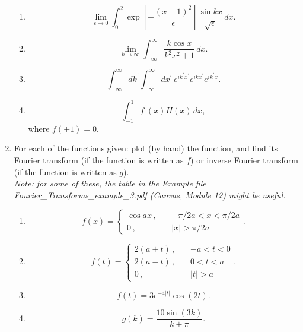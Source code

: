 \documentclass[fleqn]{article}
\begin{document}
\begin{enumerate}
\begin{enumerate}
    \item  
    \[
    \lim_{\epsilon \rightarrow 0}\int_{0}^{2}\exp \left[ -\frac{\left(
    x-1\right) ^{2}}{\epsilon }\right] \frac{\sin kx}{\sqrt{\epsilon }}\,dx.
    \]
    
    \item  
    \[
    \lim_{k\rightarrow \infty }\int_{-\infty }^{\infty }\frac{k\cos x}{
    k^{2}x^{2}+1}\,dx.
    \]
    
    \item  
    \[
    \int_{-\infty }^{\infty }dk^{\prime }\int_{-\infty }^{\infty }dx^{\prime}\,e^{ik^{\prime }x^{\prime }}e^{ikx^{\prime }}e^{ik^{\prime }x}.
    \]
    
    \item  
    \[
    \int_{-1}^{1}f^{\prime }\left( x\right) H\left( x\right) \,dx,
    \]
    where $f\left( + 1\right) =0$.
    \end{enumerate}
    
    
    
    \item For each of the functions given: plot (by hand) the function, and find its Fourier transform (if the function is written as $f$) or inverse Fourier transform (if the function is written as $g$). \\
    {\it Note: for some of these, the table in the Example file Fourier\_Transforms\_example\_3.pdf (Canvas, Module 12)  might be useful. }
    
    \begin{enumerate}
    
    \item  
    \[
    f\left( x\right) =\left\{ 
    \begin{array}{rrr}
    \cos ax \, , & \, & -\pi /2a<x<\pi /2a \\ 
    0 \, , & \, & \left| x\right| >\pi /2a
    \end{array}
    \right. .
    \]
    
    \item  
    \[
    f\left( t\right) =\left\{ 
    \begin{array}{rrr}
    2\left( a+t\right) \, ,  & \, & -a<t<0 \\ 
    2\left( a-t\right) \, , & \, & 0<t<a \\ 
    0 \, , & \, & \left| t\right| >a
    \end{array}
    \right. .
    \]
    
    \item  
    \[
    f\left( t\right) =3e^{-4\left| t\right| }\cos \left( 2t\right).
    \]
    
    \item  
    \[
    g\left( k\right) =\frac{10\sin \left( 3k\right) }{k+\pi }.
    \]
    
    \end{enumerate}
    
     
    
  \end{enumerate}
\end{document}

